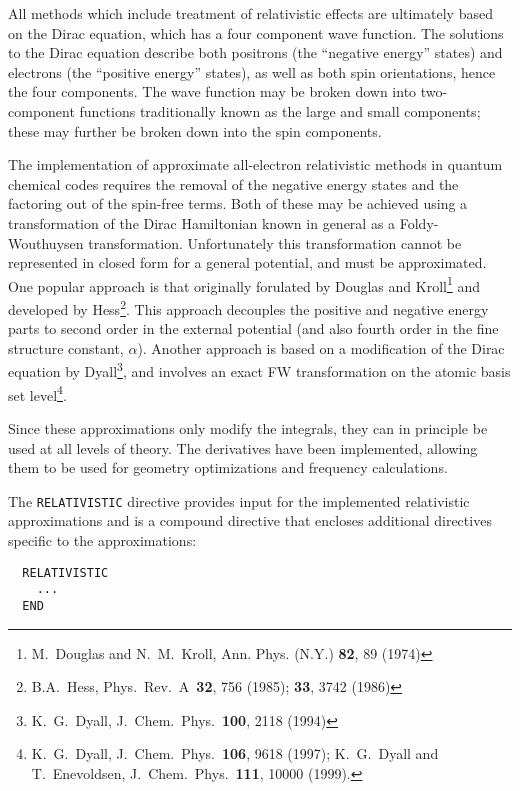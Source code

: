 \label{sec:rel}



All methods which include treatment of relativistic effects are ultimately
based on the Dirac equation, which has a four component wave function. The
solutions to the Dirac equation describe both positrons (the ``negative
energy'' states) and electrons (the ``positive energy'' states), as well as
both spin orientations, hence the four components. The wave function may be
broken down into two-component functions traditionally known as the large
and small components; these may further be broken down into the spin
components. 

The implementation of approximate all-electron relativistic methods in
quantum chemical codes requires the removal of the negative energy states
and the factoring out of the spin-free terms. Both of these may be achieved
using a transformation of the Dirac Hamiltonian known in general as a
Foldy-Wouthuysen transformation. Unfortunately this transformation cannot be
represented in closed form for a general potential, and must be
approximated.  One popular approach is that originally forulated by Douglas
and Kroll\footnote{M.~Douglas and N.~M.~Kroll, Ann. Phys. (N.Y.)  {\bf 82},
89 (1974)} and developed by Hess\footnote{B.A.~Hess, Phys.~Rev.~A~{\bf 32},
756 (1985); {\bf 33}, 3742 (1986)}. This approach decouples the positive and
negative energy parts to second order in the external potential (and also
fourth order in the fine structure constant, $\alpha$). Another approach is
based on a modification of the Dirac equation by Dyall\footnote{K.~G.~Dyall,
J.~Chem.~Phys.~{\bf 100}, 2118 (1994)}, and involves an exact FW
transformation on the atomic basis set level\footnote{K.~G.~Dyall,
J.~Chem.~Phys.~{\bf 106}, 9618 (1997); K.~G.~Dyall and T.~Enevoldsen,
J.~Chem.~Phys.~{\bf 111}, 10000 (1999).}.

Since these approximations only modify the integrals, they can in principle
be used at all levels of theory. The derivatives have been implemented, allowing
them to be used for geometry optimizations and frequency calculations.

The \verb+RELATIVISTIC+ directive provides input for the implemented relativistic 
approximations and is a compound directive that encloses additional directives 
specific to the approximations:

\begin{verbatim}
  RELATIVISTIC
    ...
  END
\end{verbatim}

